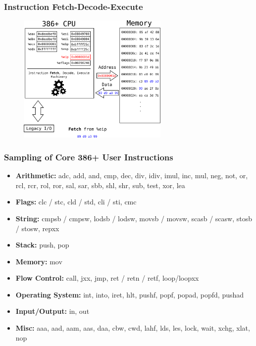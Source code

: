 \documentclass[11pt,xcolor=dvipsnames]{beamer}
\newcommand{\mvs}{\vspace{-0.95em}}
\begin{document}
\begin{frame}[fragile,t]
\frametitle{Instruction Fetch-Decode-Execute}
\mvs
\begin{figure}
\centering \includegraphics[width=0.65\textwidth]{figures/386fetch_decode_execute7.png}
\end{figure}
\end{frame}

\begin{frame}[fragile,t]
\frametitle{Sampling of Core 386+ User Instructions}
\mvs
\begin{itemize}
    \item {\bf Arithmetic:} {\ttfamily adc, add, and, cmp, dec, div, idiv, imul, inc, mul, neg, not, or, rcl, rcr, rol, ror, sal, sar, sbb, shl, shr, sub, test, xor, lea}
    \item {\bf Flags:} {\ttfamily clc / stc, cld / std, cli / sti, cmc}
    \item {\bf String:} {\ttfamily cmpsb / cmpsw, lodsb / lodsw, movsb / movsw, scasb / scasw, stosb / stosw, repxx}
    \item {\bf Stack:} {\ttfamily push, pop}
    \item {\bf Memory:} {\ttfamily mov}
    \item {\bf Flow Control:} {\ttfamily call, jxx, jmp, ret / retn / retf, loop/loopxx}
    \item {\bf Operating System:} {\ttfamily int, into, iret, hlt, pushf, popf, popad, popfd, pushad}
    \item {\bf Input/Output:} {\ttfamily in, out}
    \item {\bf Misc:} {\ttfamily aaa, aad, aam, aas, daa, cbw, cwd, lahf, lds, les, lock, wait, xchg, xlat, nop}
\end{itemize}
\end{frame}
\end{document}
